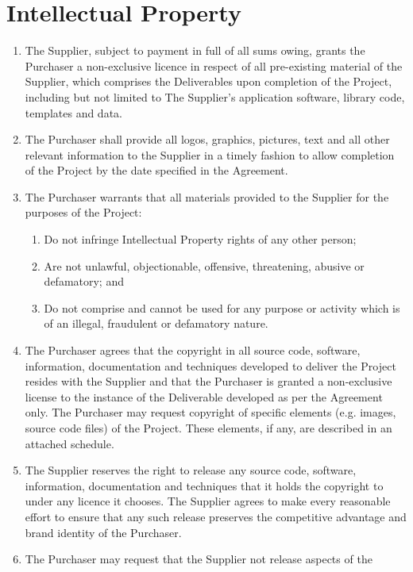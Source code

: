 \documentclass[nz-terms]{subfiles}
\begin{document}
\section{Intellectual Property}

\begin{enumerate}
\item The Supplier, subject to payment in full of all sums owing, grants the
Purchaser a non-exclusive licence in respect of all pre-existing material of
the Supplier, which comprises the Deliverables upon completion of the
Project, including but not limited to The Supplier's application software,
library code, templates and data.
\item The Purchaser shall provide all logos, graphics, pictures, text and all
other relevant information to the Supplier in a timely fashion to allow
completion of the Project by the date specified in the Agreement.
\item The Purchaser warrants that all materials provided to the Supplier for the
purposes of the Project:
    \begin{enumerate}
    \item Do not infringe Intellectual Property rights of any other person;
    \item Are not unlawful, objectionable, offensive, threatening, abusive or
    defamatory; and
    \item Do not comprise and cannot be used for any purpose or activity which
    is of an illegal, fraudulent or defamatory nature.
    \end{enumerate}
\item The Purchaser agrees that the copyright in all source code, software,
information, documentation and techniques developed to deliver the Project
resides with the Supplier and that the Purchaser is granted a non-exclusive
license to the instance of the Deliverable developed as per the Agreement
only. The Purchaser may request copyright of specific elements (e.g. images,
source code files) of the Project. These elements, if any, are described in
an attached schedule.
\item The Supplier reserves the right to release any source code, software,
information, documentation and techniques that it holds the copyright to
under any licence it chooses. The Supplier agrees to make every reasonable
effort to ensure that any such release preserves the competitive advantage
and brand identity of the Purchaser.
\item The Purchaser may request that the Supplier not release aspects of the

\end{enumerate}
\end{document}
